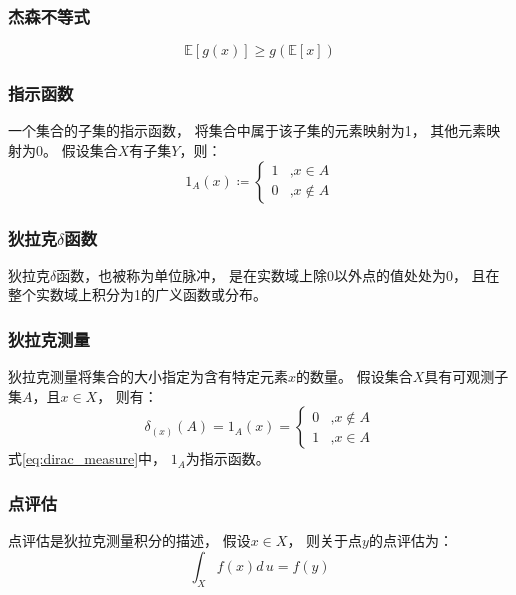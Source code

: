 \subsubsection{杰森不等式}
\begin{equation}
    \label{eq:Jensen_ineuqality}
    \mathbb{E}[g(x)]\geq g(\mathbb{E}[x])
\end{equation}

\subsubsection{指示函数}
一个集合的子集的指示函数，
将集合中属于该子集的元素映射为1，
其他元素映射为0。
假设集合{$X$}有子集{$Y$}，则：
\begin{equation}
    1_{A}(x) \coloneqq  
    \begin{cases}
        1 &\mbox{,} x\in A \\
        0 &\mbox{,}x\notin A 
    \end{cases}
\end{equation}


\subsubsection{狄拉克{$\delta$}函数}
狄拉克{$\delta$}函数，也被称为单位脉冲，
是在实数域上除0以外点的值处处为0，
且在整个实数域上积分为1的广义函数或分布。

\subsubsection{狄拉克测量}
狄拉克测量将集合的大小指定为含有特定元素{$x$}的数量。
假设集合{$X$}具有可观测子集{$A$}，且{$x \in X$}，
则有：
\begin{equation}
    \label{eq:dirac_measure}
    \delta_{(x)}(A)=1_{A}(x)=\begin{cases}
        0 &\mbox{,}x\notin A \\
        1 &\mbox{,}x\in A 
    \end{cases}
\end{equation}
式{\ref{eq:dirac_measure}}中，
{$1_{A}$}为指示函数。

\subsubsection{点评估}
点评估是狄拉克测量积分的描述，
假设{$x \in X$}，
则关于点{$y$}的点评估为：
\begin{equation}
    \label{eq:point_evaluation}
    \int_{X}f(x) d\,u =f(y)
\end{equation}

